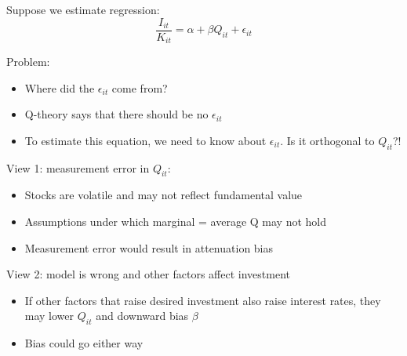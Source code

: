 \documentclass[11pt, aspectratio=169]{beamer}
\newenvironment{witemize}{\itemize\addtolength{\itemsep}{10pt}}{\enditemize}
\begin{document}
\begin{frame}{}
\begin{witemize}
\item Suppose we estimate regression:
\begin{equation*}
	\frac{I_{it}}{K_{it}} = \alpha + \beta Q_{it} + \epsilon_{it}	
\end{equation*}

\item Problem:
\begin{itemize}
	\item Where did the $\epsilon_{it}$ come from?
	\item Q-theory says that there should be no $\epsilon_{it}$
	\item To estimate this equation, we need to know about $\epsilon_{it}$. Is it orthogonal to $Q_{it}$?!
\end{itemize}

\item View 1: measurement error in $Q_{it}$:
\begin{itemize}
	\item Stocks are volatile and may not reflect fundamental value
	\item Assumptions under which marginal = average Q may not hold
	\item Measurement error would result in attenuation bias
\end{itemize}

\item View 2: model is wrong and other factors affect investment
\begin{itemize}
	\item If other factors that raise desired investment also raise interest rates, they may lower $Q_{it}$ and downward bias $\beta$
	\item Bias could go either way 
\end{itemize}
\end{witemize}
\end{frame}
\end{document}
